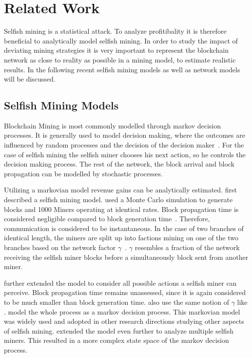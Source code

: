 \chapter{Related Work}\label{chap:relatedwork}
Selfish mining is a statistical attack. To analyze profitibality it is therefore beneficial to analytically model selfish mining. In order to study the impact of deviating mining strategies it is very important to represent the blockchain network as close to reality as possible in a mining model, to estimate realistic results. In the following recent selfish mining models as well as network models will be discussed.


\section{Selfish Mining Models}
Blockchain Mining is most commonly modelled through markov decision processes.
It is generally used to model decision making, where the outcomes are influenced by random processes and the decision of the decision maker~\cite{ibe2013markov}.
For the case of selfish mining the selfish miner chooses his next action, so he controls the decision making process. The rest of the network, the block arrival and block propagation can be modelled by stochastic processes. 

Utilizing a markovian model revenue gains can be analytically estimated. \citeauthor{eyal} first described a selfish mining model.
\citeauthor{eyal} used a Monte Carlo simulation to generate blocks and 1000 Miners operating at identical rates. Block propagation time is considered negligible compared to block generation time~\cite{eyal}. Therefore, communication is considered to be instantaneous. In the case of two branches of identical length, the miners are split up into factions mining on one of the two branches based on the network factor $\gamma$~\cite{eyal}. $\gamma$ resembles a fraction of the network receiving the selfish miner blocks before a simultaneously block sent from another miner.

\citeauthor{optimal_sm} further extended the model to consider all possible actions a selfish miner can perceive. Block propagation time remains unassessed, since it is again considered to be much smaller than block generation time. \citeauthor{optimal_sm} also use the same notion of $\gamma$ like \citeauthor{eyal}. \citeauthor{optimal_sm} model the whole process as a markov decision process.
This markovian model was widely used and adopted in other research directions studying other aspects of selfish mining.
\citeauthor{deepDiveSM} extended the model even further to analyze multiple selfish miners. This resulted in a more complex state space of the markov decision process.


